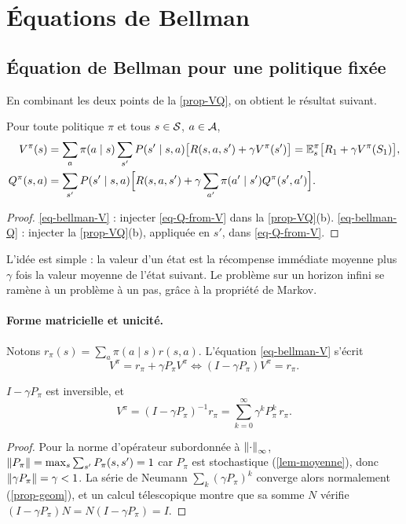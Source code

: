 \section{Équations de Bellman}\label{sec-bellman}

\subsection{Équation de Bellman pour une politique fixée}

En combinant les deux points de la \cref{prop-VQ}, on obtient le résultat suivant.

\begin{theoreme}\label{thm-bellman-pi}
Pour toute politique $\pi$ et tous $s\in\mathcal{S}$, $a\in\mathcal{A}$,
\begin{align}
V^\pi(s)&=\sum_a\pi(a\mid s)\sum_{s'}P(s'\mid s,a)\big[R(s,a,s')+\gamma V^\pi(s')\big]
=\mathbb{E}^\pi_s\big[R_1+\gamma V^\pi(S_1)\big],\label{eq-bellman-V}\\
Q^\pi(s,a)&=\sum_{s'}P(s'\mid s,a)\Big[R(s,a,s')+\gamma\sum_{a'}\pi(a'\mid s')Q^\pi(s',a')\Big].\label{eq-bellman-Q}
\end{align}
\end{theoreme}
\begin{proof}
\eqref{eq-bellman-V} : injecter \eqref{eq-Q-from-V} dans la \cref{prop-VQ}(b). \eqref{eq-bellman-Q} : injecter la \cref{prop-VQ}(b), appliquée en $s'$, dans \eqref{eq-Q-from-V}.
\end{proof}

L'idée est simple : la valeur d'un état est la récompense immédiate moyenne plus $\gamma$ fois la valeur moyenne de l'état suivant. Le problème sur un horizon infini se ramène à un problème à un pas, grâce à la propriété de Markov.

\paragraph{Forme matricielle et unicité.} Notons $r_\pi(s)=\sum_a\pi(a\mid s)r(s,a)$. L'équation \eqref{eq-bellman-V} s'écrit
\[
V^\pi=r_\pi+\gamma P_\pi V^\pi\iff(I-\gamma P_\pi)V^\pi=r_\pi.
\]

\begin{proposition}\label{prop-neumann}
$I-\gamma P_\pi$ est inversible, et
\[
V^\pi=(I-\gamma P_\pi)^{-1}r_\pi=\sum_{k=0}^{\infty}\gamma^kP_\pi^k\,r_\pi.
\]
\end{proposition}
\begin{proof}
Pour la norme d'opérateur subordonnée à $\left\lVert \cdot \right\rVert_\infty$, $\left\lVert P_\pi \right\rVert=\max_s\sum_{s'}P_\pi(s,s')=1$ car $P_\pi$ est stochastique (\cref{lem-moyenne}), donc $\left\lVert \gamma P_\pi \right\rVert=\gamma<1$. La série de Neumann $\sum_k(\gamma P_\pi)^k$ converge alors normalement (\cref{prop-geom}), et un calcul télescopique montre que sa somme $N$ vérifie $(I-\gamma P_\pi)N=N(I-\gamma P_\pi)=I$.
\end{proof}

